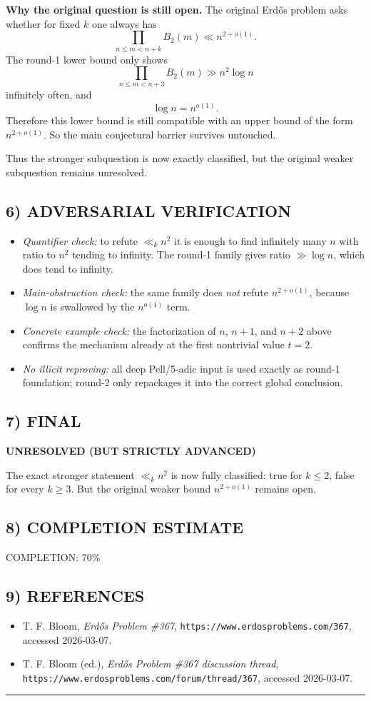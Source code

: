 \medskip
\textbf{Why the original question is still open.}
The original Erd\H{o}s problem asks whether for fixed $k$ one always has
\[
\prod_{n\le m<n+k} B_2(m) \ll n^{2+o(1)}.
\]
The round-1 lower bound only shows
\[
\prod_{n\le m<n+3} B_2(m) \gg n^2\log n
\]
infinitely often, and
\[
\log n=n^{o(1)}.
\]
Therefore this lower bound is still compatible with an upper bound of the form $n^{2+o(1)}$. So the main conjectural barrier survives untouched.

Thus the stronger subquestion is now exactly classified, but the original weaker subquestion remains unresolved.

\subsection*{6) ADVERSARIAL VERIFICATION}
\begin{itemize}
\item \emph{Quantifier check:} to refute $\ll_k n^2$ it is enough to find infinitely many $n$ with ratio to $n^2$ tending to infinity. The round-1 family gives ratio $\gg \log n$, which does tend to infinity.
\item \emph{Main-obstruction check:} the same family does \emph{not} refute $n^{2+o(1)}$, because $\log n$ is swallowed by the $n^{o(1)}$ term.
\item \emph{Concrete example check:} the factorization of $n$, $n+1$, and $n+2$ above confirms the mechanism already at the first nontrivial value $t=2$.
\item \emph{No illicit reproving:} all deep Pell/5-adic input is used exactly as round-1 foundation; round-2 only repackages it into the correct global conclusion.
\end{itemize}

\subsection*{7) FINAL}
\textbf{UNRESOLVED (BUT STRICTLY ADVANCED)}

The exact stronger statement $\ll_k n^2$ is now fully classified: true for $k\le 2$, false for every $k\ge 3$. But the original weaker bound $n^{2+o(1)}$ remains open.

\subsection*{8) COMPLETION ESTIMATE}
COMPLETION: 70\%

\subsection*{9) REFERENCES}
\begin{itemize}
\item[Bloom367] T. F. Bloom, \emph{Erd\H{o}s Problem \#367}, \texttt{https://www.erdosproblems.com/367}, accessed 2026-03-07.
\item[Thread367] T. F. Bloom (ed.), \emph{Erd\H{o}s Problem \#367 discussion thread}, \texttt{https://www.erdosproblems.com/forum/thread/367}, accessed 2026-03-07.
\end{itemize}

\bigskip\hrule\bigskip

